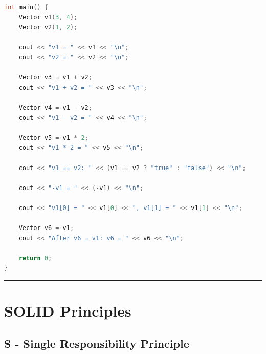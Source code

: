 \begin{lstlisting}[language={C++}]
int main() {
    Vector v1(3, 4);
    Vector v2(1, 2);
    
    cout << "v1 = " << v1 << "\n";
    cout << "v2 = " << v2 << "\n";
    
    Vector v3 = v1 + v2;
    cout << "v1 + v2 = " << v3 << "\n";
    
    Vector v4 = v1 - v2;
    cout << "v1 - v2 = " << v4 << "\n";
    
    Vector v5 = v1 * 2;
    cout << "v1 * 2 = " << v5 << "\n";
    
    cout << "v1 == v2: " << (v1 == v2 ? "true" : "false") << "\n";
    
    cout << "-v1 = " << (-v1) << "\n";
    
    cout << "v1[0] = " << v1[0] << ", v1[1] = " << v1[1] << "\n";
    
    Vector v6 = v1;
    cout << "After v6 = v1: v6 = " << v6 << "\n";
    
    return 0;
}
\end{lstlisting}

\begin{center}\rule{0.5\linewidth}{0.5pt}\end{center}

\hypertarget{solid-principles}{%
\section{SOLID Principles}\label{solid-principles}}

\hypertarget{s---single-responsibility-principle}{%
\subsection{S - Single Responsibility
Principle}\label{s---single-responsibility-principle}}

